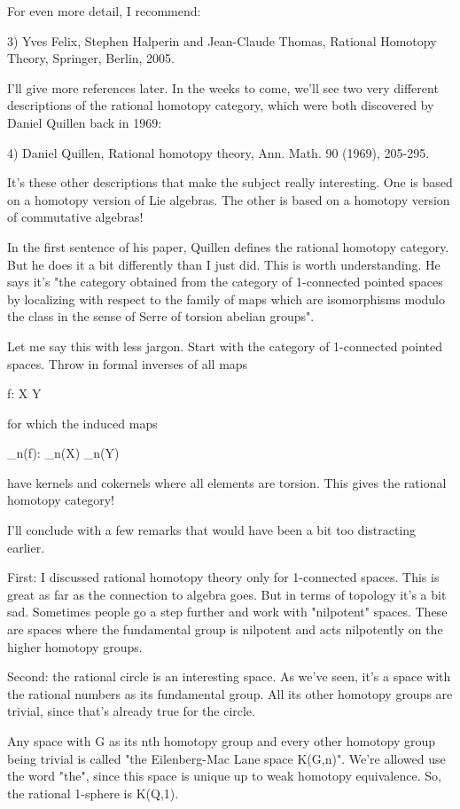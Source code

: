 For even more detail, I recommend:

3) Yves Felix, Stephen Halperin and Jean-Claude Thomas, Rational
Homotopy Theory, Springer, Berlin, 2005.

I'll give more references later.  In the weeks to come, we'll see two
very different descriptions of the rational homotopy category, which
were both discovered by Daniel Quillen back in 1969:

4) Daniel Quillen, Rational homotopy theory, Ann. Math. 90 (1969), 
205-295.   

It's these other descriptions that make the subject really interesting.
One is based on a homotopy version of Lie algebras.  The other is
based on a homotopy version of commutative algebras!

In the first sentence of his paper, Quillen defines the rational
homotopy category.  But he does it a bit differently than I just did.
This is worth understanding.  He says it's "the category obtained from
the category of 1-connected pointed spaces by localizing with respect
to the family of maps which are isomorphisms modulo the class in the
sense of Serre of torsion abelian groups".

Let me say this with less jargon.  Start with the category of
1-connected pointed spaces.  Throw in formal inverses of all maps

f: X \to  Y

for which the induced maps

\pi _{n}(f): \pi _{n}(X) \to  \pi _{n}(Y)

have kernels and cokernels where all elements are torsion.  This gives
the rational homotopy category!

I'll conclude with a few remarks that would have been a bit too
distracting earlier.

First: I discussed rational homotopy theory only for 1-connected
spaces.  This is great as far as the connection to algebra goes.  But
in terms of topology it's a bit sad.  Sometimes people go a step
further and work with "nilpotent" spaces.  These are spaces where the
fundamental group is nilpotent and acts nilpotently on the higher
homotopy groups.

Second: the rational circle is an interesting space.  As we've seen,
it's a space with the rational numbers as its fundamental group.  All
its other homotopy groups are trivial, since that's already true for
the circle.

Any space with G as its nth homotopy group and every other homotopy
group being trivial is called "the Eilenberg-Mac Lane space K(G,n)".
We're allowed use the word "the", since this space is unique up to
weak homotopy equivalence.  So, the rational 1-sphere is K(Q,1).


